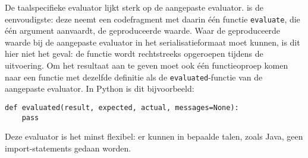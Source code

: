 De taalspecifieke evaluator lijkt sterk op de aangepaste evaluator.
is de eenvoudigste: deze neemt een codefragment met daarin één functie \texttt{evaluate}, die één argument aanvaardt, de geproduceerde waarde.
Waar de geproduceerde waarde bij de aangepaste evaluator in het serialisatieformaat moet kunnen, is dit hier niet het geval: de functie wordt rechtstreeks opgeroepen tijdens de uitvoering.
Om het resultaat aan te geven moet ook één functieoproep komen naar een functie met dezelfde definitie als de \texttt{evaluated}-functie van de aangepaste evaluator.
In Python is dit bijvoorbeeld:

\begin{verbatim}
def evaluated(result, expected, actual, messages=None):
    pass
\end{verbatim}

Deze evaluator is het minst flexibel: er kunnen in bepaalde talen, zoals Java, geen import-statements gedaan worden.
